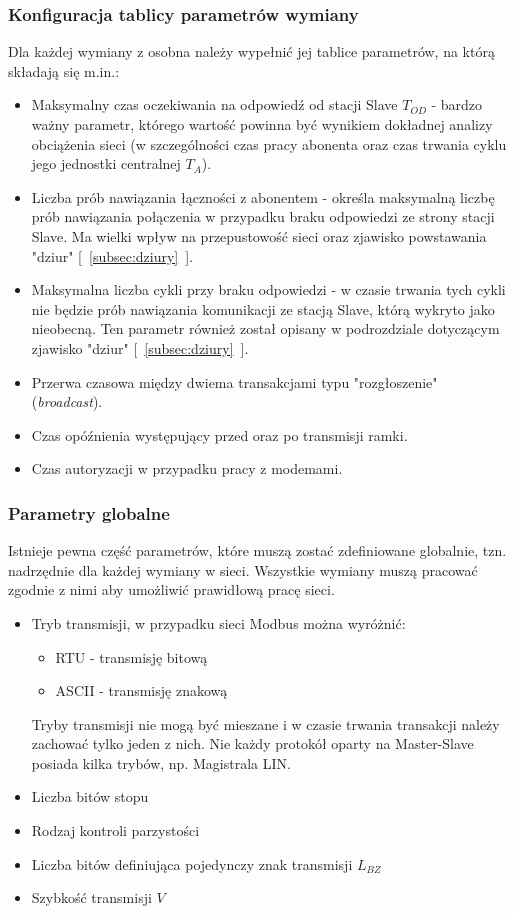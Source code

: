 \documentclass[a4paper,twoside]{article}
\begin{document}
	\subsubsection{Konfiguracja tablicy parametrów wymiany}
	Dla każdej wymiany z osobna należy wypełnić jej tablice parametrów, na którą składają się m.in.:
	\begin{itemize}
		\item Maksymalny czas oczekiwania na odpowiedź od stacji Slave $ T_{OD} $ - bardzo ważny parametr, którego wartość powinna być wynikiem dokładnej analizy obciążenia sieci (w szczególności czas pracy abonenta oraz czas trwania cyklu jego jednostki centralnej $ T_{A} $).
		\item Liczba prób nawiązania łączności z abonentem - określa maksymalną liczbę prób nawiązania połączenia w przypadku braku odpowiedzi ze strony stacji Slave. Ma wielki wpływ na przepustowość sieci oraz zjawisko powstawania "dziur" [~\ref{subsec:dziury}~].
		\item Maksymalna liczba cykli przy braku odpowiedzi - w czasie trwania tych cykli nie będzie prób nawiązania komunikacji ze stacją Slave, którą wykryto jako nieobecną. Ten parametr również został opisany w podrozdziale dotyczącym zjawisko "dziur" [~\ref{subsec:dziury}~].
		\item Przerwa czasowa między dwiema transakcjami typu "rozgłoszenie" (\emph{broadcast}).
		\item Czas opóźnienia występujący przed oraz po transmisji ramki.
		\item Czas autoryzacji w przypadku pracy z modemami.
	\end{itemize}
	\subsubsection{Parametry globalne}
	Istnieje pewna część parametrów, które muszą zostać zdefiniowane globalnie, tzn. nadrzędnie dla każdej wymiany w sieci. Wszystkie wymiany muszą pracować zgodnie z nimi aby umożliwić prawidłową pracę sieci.
	\begin{itemize}
		\item Tryb transmisji, w przypadku sieci Modbus można wyróżnić:
		\begin{itemize}
			\item RTU - transmisję bitową
			\item ASCII - transmisję znakową
		\end{itemize}
		Tryby transmisji nie mogą być mieszane i w czasie trwania transakcji należy zachować tylko jeden z nich. Nie każdy protokół oparty na Master-Slave posiada kilka trybów, np. Magistrala LIN.
		\item Liczba bitów stopu
		\item Rodzaj kontroli parzystości
		\item Liczba bitów definiująca pojedynczy znak transmisji $ L_{BZ} $
		\item Szybkość transmisji $ V $
	\end{itemize}
\newpage
\end{document}
